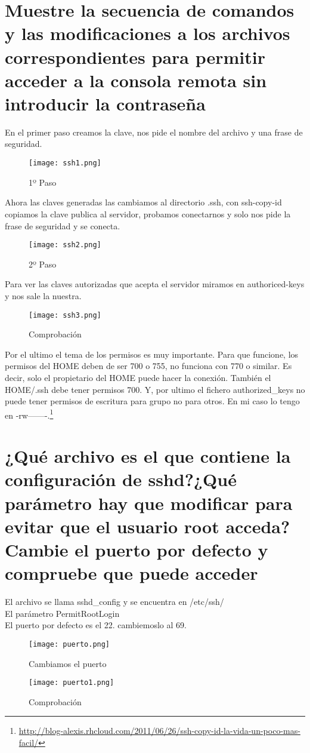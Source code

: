 \newpage

\section{Muestre la secuencia de comandos y las modificaciones a los archivos correspondientes para permitir acceder a la consola remota sin introducir la contraseña}
En el primer paso creamos la clave, nos pide el nombre del archivo y una frase de seguridad.
\begin{figure}[H] 
\centering
\texttt{[image: ssh1.png]}  
\label{figura2:}
\caption{1º Paso}
\end{figure}
Ahora las claves generadas las cambiamos al directorio .ssh, con ssh-copy-id copiamos la clave publica al servidor, probamos conectarnos y solo nos pide la frase de seguridad y se conecta.

\begin{figure}[H] 
\centering
\texttt{[image: ssh2.png]}  
\label{figura3:}
\caption{2º Paso}
\end{figure}
Para ver las claves autorizadas que acepta el servidor miramos en authoriced-keys y nos sale la nuestra.
\begin{figure}[H] 
\centering
\texttt{[image: ssh3.png]}  
\label{figura4:}
\caption{Comprobación}
\end{figure}
Por el ultimo el tema de los permisos es muy importante. Para que funcione, los permisos del HOME deben de ser 700 o 755, no funciona con 770 o similar. Es decir, solo el propietario del HOME puede hacer la conexión.
También el HOME/.ssh debe tener permisos 700. 
Y, por ultimo el fichero authorized\_keys no puede tener permisos de escritura para grupo no para otros. En mi caso lo tengo en -rw-------.\footnote{\url{http://blog-alexis.rhcloud.com/2011/06/26/ssh-copy-id-la-vida-un-poco-mas-facil/}}
\section{¿Qué archivo es el que contiene la configuración de sshd?¿Qué parámetro hay que modificar para evitar que el usuario root acceda?Cambie el puerto por defecto y compruebe que puede acceder}
El archivo se llama sshd\_config y se encuentra en /etc/ssh/
\\El parámetro PermitRootLogin
\\El puerto por defecto es el 22. cambiemoslo al 69.
\begin{figure}[H] 
\centering
\texttt{[image: puerto.png]}  
\label{figura5:}
\caption{Cambiamos el puerto}
\end{figure}
\begin{figure}[H] 
\centering
\texttt{[image: puerto1.png]}  
\label{figura6:}
\caption{Comprobación}
\end{figure}
